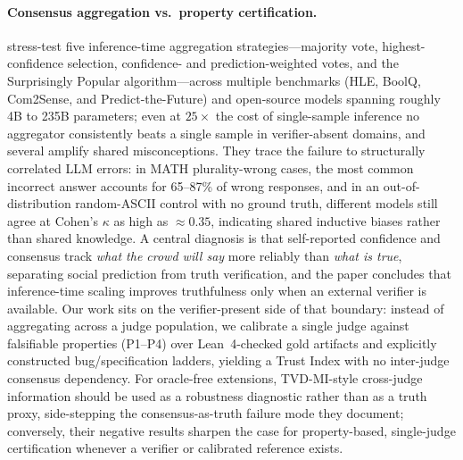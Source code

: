 \documentclass{article}
\begin{document}
\paragraph{Consensus aggregation vs.\ property certification.}
\citet{denisovblanch2026consensus} stress-test five inference-time aggregation strategies---majority vote, highest-confidence selection, confidence- and prediction-weighted votes, and the Surprisingly Popular algorithm---across multiple benchmarks (HLE, BoolQ, Com2Sense, and Predict-the-Future) and open-source models spanning roughly 4B to 235B parameters; even at $25\times$ the cost of single-sample inference no aggregator consistently beats a single sample in verifier-absent domains, and several amplify shared misconceptions.
They trace the failure to structurally correlated LLM errors: in MATH plurality-wrong cases, the most common incorrect answer accounts for 65--87\% of wrong responses, and in an out-of-distribution random-ASCII control with no ground truth, different models still agree at Cohen's $\kappa$ as high as ${\approx}0.35$, indicating shared inductive biases rather than shared knowledge.
A central diagnosis is that self-reported confidence and consensus track \emph{what the crowd will say} more reliably than \emph{what is true}, separating social prediction from truth verification, and the paper concludes that inference-time scaling improves truthfulness only when an external verifier is available.
Our work sits on the verifier-present side of that boundary: instead of aggregating across a judge population, we calibrate a single judge against falsifiable properties (P1--P4) over Lean~4-checked gold artifacts and explicitly constructed bug/specification ladders, yielding a Trust Index with no inter-judge consensus dependency.
For oracle-free extensions, TVD-MI-style cross-judge information should be used as a robustness diagnostic rather than as a truth proxy, side-stepping the consensus-as-truth failure mode they document; conversely, their negative results sharpen the case for property-based, single-judge certification whenever a verifier or calibrated reference exists.
\end{document}
